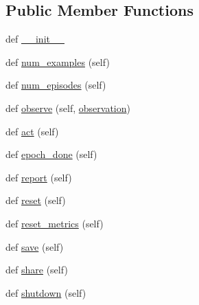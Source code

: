\subsection*{Public Member Functions}
\begin{DoxyCompactItemize}
\item 
def \hyperlink{classparlai_1_1core_1_1agents_1_1MultiTaskTeacher_a6f2172c82decdf5b4cad871c654c5e2f}{\+\_\+\+\_\+init\+\_\+\+\_\+}
\item 
def \hyperlink{classparlai_1_1core_1_1agents_1_1MultiTaskTeacher_a21fa6d0565bd35e54a74806ecca62e34}{num\+\_\+examples} (self)
\item 
def \hyperlink{classparlai_1_1core_1_1agents_1_1MultiTaskTeacher_ac292d1cb86a3769c352e2d3658f324d2}{num\+\_\+episodes} (self)
\item 
def \hyperlink{classparlai_1_1core_1_1agents_1_1MultiTaskTeacher_a42290221cabd0f1ca21cb87a2228af10}{observe} (self, \hyperlink{classparlai_1_1core_1_1agents_1_1Agent_aedbecc4b4aa7af7413882a0429e0f1db}{observation})
\item 
def \hyperlink{classparlai_1_1core_1_1agents_1_1MultiTaskTeacher_a29a2c8f7679aafd2d67b4b0db54d58a3}{act} (self)
\item 
def \hyperlink{classparlai_1_1core_1_1agents_1_1MultiTaskTeacher_a17444e342ab19c23cee28bba08a64df9}{epoch\+\_\+done} (self)
\item 
def \hyperlink{classparlai_1_1core_1_1agents_1_1MultiTaskTeacher_ac93a499c6438ee1b57d0ad6a702851ae}{report} (self)
\item 
def \hyperlink{classparlai_1_1core_1_1agents_1_1MultiTaskTeacher_ae4eeda38c4164498018ee6515050ae43}{reset} (self)
\item 
def \hyperlink{classparlai_1_1core_1_1agents_1_1MultiTaskTeacher_a78eb3c163a158deda3bb6bd9000fcee2}{reset\+\_\+metrics} (self)
\item 
def \hyperlink{classparlai_1_1core_1_1agents_1_1MultiTaskTeacher_abb082dd4c5be92b7ce7683b16d0abd2c}{save} (self)
\item 
def \hyperlink{classparlai_1_1core_1_1agents_1_1MultiTaskTeacher_adbd1854cad9eb58ba1c7736b44bf5e96}{share} (self)
\item 
def \hyperlink{classparlai_1_1core_1_1agents_1_1MultiTaskTeacher_a259dd3bec3f24669e835d8fbac657c3b}{shutdown} (self)
\end{DoxyCompactItemize}
